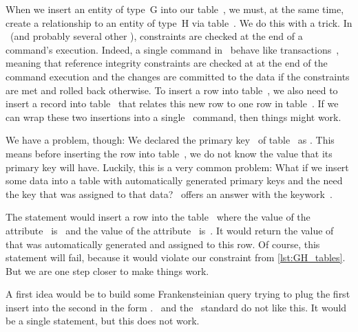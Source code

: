 When we insert an entity of type~G into our table~, we must, at the same time, create a relationship to an entity of type~H via table~.
We do this with a trick.%
%
%
%
In \postgresql~(and probably several other ), constraints are checked at the end of a command's execution.
Indeed, a single command in \postgresql\ behave like transactions~\cite{PGDG:T}, meaning that reference integrity constraints are checked at at the end of the command execution and the changes are committed to the data if the constraints are met and rolled back otherwise.
To insert a row into table~, we also need to insert a record into table~ that relates this new row to one row in table~.
If we can wrap these two insertions into a single \sql\ command, then things might work.%
%
\begin{sloppypar}%
We have a problem, though:
We declared the primary key~ of table~ as .
This means before inserting the row into table~, we do not know the value that its primary key will have.
Luckily, this is a very common problem:
What if we insert some data into a table with automatically generated primary keys and the need the key that was assigned to that data?
\sql\ offers an answer with the  keywork~\cite{PGDG:PD:RDFMR}.%
\end{sloppypar}%
%
The statement  would insert a row into the table~ where the value of the attribute~ is~ and the value of the attribute~ is~.
It would return the value of~ that was automatically generated and assigned to this row.
Of course, this statement will fail, because it would violate our constraint  from \cref{lst:GH_tables}.
But we are one step closer to make things work.%
%
\begin{sloppypar}%
A first idea would be to build some Frankensteinian query trying to plug the first insert into the second in the form \linebreak[3].
\postgresql\ and the \sql\ standard do not like this.
It would be a single statement, but this does not work.%
\end{sloppypar}%
